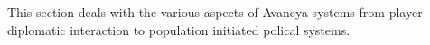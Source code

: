 


This section deals with the various aspects of Avaneya systems from player diplomatic interaction to population initiated polical systems. 



